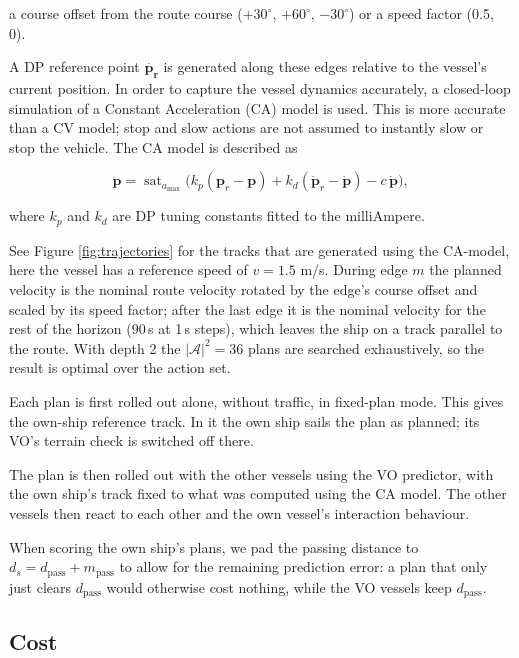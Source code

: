 \documentclass[10pt,a4paper]{article}
\begin{document}
a course offset from the route course ($+30^\circ$, $+60^\circ$, $-30^\circ$) or
a speed factor (0.5, 0). 

A DP reference point $\mathbf{\dot{p_r}}$ is generated along these edges relative to the vessel's current position.
In order to capture the vessel dynamics accurately, a closed-loop simulation of a Constant Acceleration (CA) model
is used. This is more accurate than a CV model; stop and slow actions are not assumed to instantly slow or stop
the vehicle. The CA model is described as

\begin{equation}
  \ddot{\bm p} = \operatorname{sat}_{a_{\max}}\!\Big(k_p(\bm p_r - \bm p) + k_d(\dot{\bm p}_r - \dot{\bm p}) - c\,\dot{\bm p}\Big),
\end{equation}

where $k_p$ and $k_d$ are DP tuning constants fitted to the milliAmpere.


See Figure \ref{fig:trajectories} for the tracks that are generated using the CA-model, here the vessel has a reference speed of $v=1.5$ m/s. 
During edge $m$ the planned velocity is the nominal
route velocity rotated by the edge's course offset and scaled by its speed
factor; after the last edge it is the nominal velocity for the rest of the
horizon (90\,s at 1\,s steps), which leaves the ship on a track parallel to the
route. With depth 2 the $|\mathcal A|^2 = 36$ plans are searched exhaustively,
so the result is optimal over the action set.


Each plan is first rolled out alone, without traffic, in fixed-plan mode. This
gives the own-ship reference track. In it the own ship sails the plan as
planned; its VO's terrain check is switched off there. 

The plan is then rolled out with the other vessels using the VO predictor, with
the own ship's track fixed to what was computed using the CA model. The other vessels then
react to each other and the own vessel's interaction behaviour.

When scoring the own ship's plans, we pad the passing distance to $d_s = d_{\text{pass}} + m_{\text{pass}}$
to allow for the remaining prediction error: a plan that only just clears $d_{\text{pass}}$ would
otherwise cost nothing, while the VO vessels keep $d_{\text{pass}}$.

\subsection{Cost} 
\end{document}
